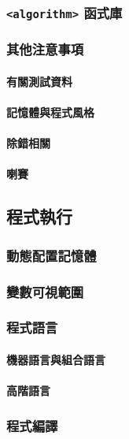 \documentclass[12pt,a4paper,oneside]{article}
\begin{document}
\begin{CJK}{UTF8}{bkai}
\subsubsection{\lstinline!<algorithm>! 函式庫}

\subsubsection{其他注意事項}

\paragraph{有關測試資料}

\paragraph{記憶體與程式風格}

\paragraph{除錯相關}

\paragraph{喇賽}

\subsection{程式執行}

\subsubsection{動態配置記憶體}

\subsubsection{變數可視範圍}

\subsubsection{程式語言}

\paragraph{機器語言與組合語言}
\paragraph{高階語言}

\subsubsection{程式編譯}

\ifx \allfiles \undefined

\printindex

\clearpage
\end{CJK}
\end{document}
